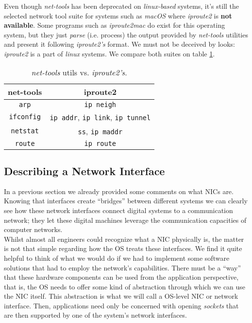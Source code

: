             Even though \textit{net-tools} has been deprecated on \textit{linux-based} systems, it's still the selected network tool suite for systems such as \textit{macOS} where \textit{iproute2} is \textbf{not available}. Some programs such as \textit{iproute2mac} do exist for this operating system, but they just \textit{parse} (i.e. process) the output provided by \textit{net-tools} utilities and present it following \textit{iproute2's} format. We must not be deceived by looks: \textit{iproute2} is a part of \textit{linux} systems. We compare both suites on table \ref{tab:net-tools-vs-iproute2}.\\

            \begin{table}
                \centering
                \begin{tabular}{|c|c|}
                    \hline
                    \textbf{net-tools} & \textbf{iproute2}\\
                    \hline
                    \texttt{arp} & \texttt{ip neigh}\\
                    \hline
                    \texttt{ifconfig} & \texttt{ip addr}, \texttt{ip link}, \texttt{ip tunnel}\\
                    \hline
                    \texttt{netstat} & \texttt{ss}, \texttt{ip maddr}\\
                    \hline
                    \texttt{route} & \texttt{ip route}\\
                    \hline
                \end{tabular}
                \caption[\textit{net-tools} vs. \textit{iproute2}]{\textit{net-tools} utils vs. \textit{iproute2's}. \cite{bib:nettools-vs-iproute2}}
                \label{tab:net-tools-vs-iproute2}
            \end{table}

        \subsection{Describing a Network Interface}
            In a previous section we already provided some comments on what NICs are. Knowing that interfaces create ``bridges'' between different systems we can clearly see how these network interfaces connect digital systems to a communication network; they let these digital machines leverage the communication capacities of computer networks.\\

            Whilst almost all engineers could recognize what a NIC physically is, the matter is not that simple regarding how the OS treats these interfaces. We find it quite helpful to think of what we would do if we had to implement some software solutions that had to employ the network's capabilities. There must be a ``way'' that these hardware components can be used from the application perspective, that is, the OS needs to offer some kind of abstraction through which we can use the NIC itself. This abstraction is what we will call a OS-level NIC or network interface. Then, applications need only be concerned with opening \textit{sockets} that are then supported by one of the system's network interfaces.\\

